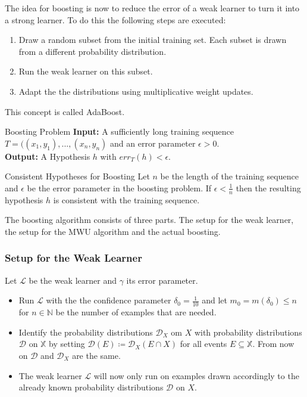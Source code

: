 \documentclass[english]{panikzettel}
\begin{document}
The idea for boosting is now to reduce the error of a weak learner to turn it into a strong learner. To do this the following steps are executed:
\begin{enumerate}
\item Draw a random subset from the initial training set. Each subset is drawn from a different probability distribution.
\item Run the weak learner on this subset.
\item Adapt the the distributions using multiplicative weight updates.
\end{enumerate}
This concept is called AdaBoost.

\begin{halfboxl}
\vspace{-\baselineskip}
\begin{defi}{Boosting Problem}
\textbf{Input:} A sufficiently long training sequence $T=((x_1,y_1),...,(x_n,y_n)$ and an error parameter $\epsilon>0$.\\
\textbf{Output:} A Hypothesis $h$ with $err_T(h)<\epsilon$.
\end{defi}
\end{halfboxl}
\begin{halfboxr}
\vspace{-\baselineskip}
\begin{theo}{Consistent Hypotheses for Boosting}
Let $n$ be the length of the training sequence and $\epsilon$ be the error parameter in the boosting problem. If $\epsilon<\frac{1}{n}$ then the resulting hypothesis $h$ is consistent with the training sequence.
\end{theo}
\end{halfboxr}

The boosting algorithm consists of three parts. The setup for the weak learner, the setup for the MWU algorithm and the actual boosting.

\subsubsection{Setup for the Weak Learner}
Let $\mathcal{L}$ be the weak learner and $\gamma$ its error parameter.
\begin{itemize}
\item Run $\mathcal{L}$ with the the confidence parameter $\delta_0=\frac{1}{10}$ and let $m_0=m(\delta_0)\leq n$ for $n\in\mathbb{N}$ be the number of examples that are needed.
\item Identify the probability distributions $\mathcal{D}_X$ om $X$ with probability distributions $\mathcal{D}$ on $\mathbb{X}$ by setting $\mathcal{D}(E)\coloneqq \mathcal{D}_X(E\cap X)$ for all events $E\subseteq \mathbb{X}$. From now on $\mathcal{D}$ and $\mathcal{D}_X$ are the same.
\item The weak learner $\mathcal{L}$ will now only run on examples drawn accordingly to the already known probability distributions $\mathcal{D}$ on $X$.
\end{itemize}
\end{document}
